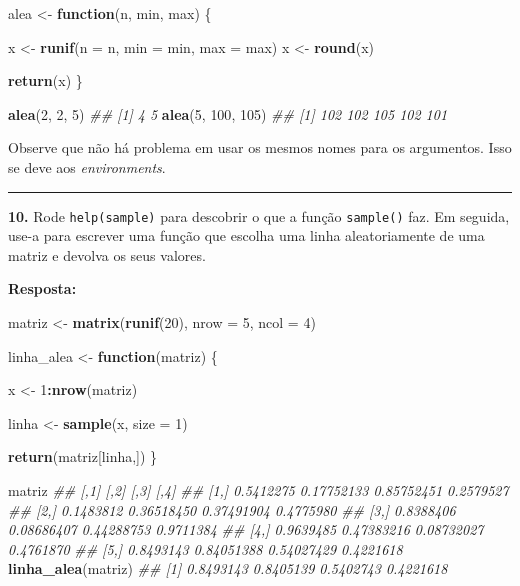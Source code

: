 \documentclass[]{book}
\newenvironment{Shaded}{\begin{snugshade}}{\end{snugshade}}
\newcommand{\CommentTok}[1]{\textcolor[rgb]{0.56,0.35,0.01}{\textit{#1}}}
\newcommand{\ControlFlowTok}[1]{\textcolor[rgb]{0.13,0.29,0.53}{\textbf{#1}}}
\newcommand{\DataTypeTok}[1]{\textcolor[rgb]{0.13,0.29,0.53}{#1}}
\newcommand{\DecValTok}[1]{\textcolor[rgb]{0.00,0.00,0.81}{#1}}
\newcommand{\KeywordTok}[1]{\textcolor[rgb]{0.13,0.29,0.53}{\textbf{#1}}}
\newcommand{\NormalTok}[1]{#1}
\newcommand{\OperatorTok}[1]{\textcolor[rgb]{0.81,0.36,0.00}{\textbf{#1}}}
\newcommand{\StringTok}[1]{\textcolor[rgb]{0.31,0.60,0.02}{#1}}
\begin{document}
\begin{Shaded}
\begin{Highlighting}[]
\NormalTok{alea <-}\StringTok{ }\ControlFlowTok{function}\NormalTok{(n, min, max) \{}
  
\NormalTok{  x <-}\StringTok{ }\KeywordTok{runif}\NormalTok{(}\DataTypeTok{n =}\NormalTok{ n, }\DataTypeTok{min =}\NormalTok{ min, }\DataTypeTok{max =}\NormalTok{ max)}
\NormalTok{  x <-}\StringTok{ }\KeywordTok{round}\NormalTok{(x)}
  
  \KeywordTok{return}\NormalTok{(x)}
\NormalTok{\}}

\KeywordTok{alea}\NormalTok{(}\DecValTok{2}\NormalTok{, }\DecValTok{2}\NormalTok{, }\DecValTok{5}\NormalTok{)}
\CommentTok{## [1] 4 5}
\KeywordTok{alea}\NormalTok{(}\DecValTok{5}\NormalTok{, }\DecValTok{100}\NormalTok{, }\DecValTok{105}\NormalTok{)}
\CommentTok{## [1] 102 102 105 102 101}
\end{Highlighting}
\end{Shaded}

Observe que não há problema em usar os mesmos nomes para os argumentos. Isso se deve aos \emph{environments}.

\begin{center}\rule{0.5\linewidth}{\linethickness}\end{center}

\textbf{10.} Rode \texttt{help(sample)} para descobrir o que a função \texttt{sample()} faz. Em seguida, use-a para escrever uma função que escolha uma linha aleatoriamente de uma matriz e devolva os seus valores.

\textbf{Resposta:}

\begin{Shaded}
\begin{Highlighting}[]
\NormalTok{matriz <-}\StringTok{ }\KeywordTok{matrix}\NormalTok{(}\KeywordTok{runif}\NormalTok{(}\DecValTok{20}\NormalTok{), }\DataTypeTok{nrow =} \DecValTok{5}\NormalTok{, }\DataTypeTok{ncol =} \DecValTok{4}\NormalTok{)}

\NormalTok{linha_alea <-}\StringTok{ }\ControlFlowTok{function}\NormalTok{(matriz) \{}
  
\NormalTok{  x <-}\StringTok{ }\DecValTok{1}\OperatorTok{:}\KeywordTok{nrow}\NormalTok{(matriz)}
  
\NormalTok{  linha <-}\StringTok{ }\KeywordTok{sample}\NormalTok{(x, }\DataTypeTok{size =} \DecValTok{1}\NormalTok{)}
  
  \KeywordTok{return}\NormalTok{(matriz[linha,])}
\NormalTok{\}}

\NormalTok{matriz}
\CommentTok{##           [,1]       [,2]       [,3]      [,4]}
\CommentTok{## [1,] 0.5412275 0.17752133 0.85752451 0.2579527}
\CommentTok{## [2,] 0.1483812 0.36518450 0.37491904 0.4775980}
\CommentTok{## [3,] 0.8388406 0.08686407 0.44288753 0.9711384}
\CommentTok{## [4,] 0.9639485 0.47383216 0.08732027 0.4761870}
\CommentTok{## [5,] 0.8493143 0.84051388 0.54027429 0.4221618}
\KeywordTok{linha_alea}\NormalTok{(matriz)}
\CommentTok{## [1] 0.8493143 0.8405139 0.5402743 0.4221618}
\end{Highlighting}
\end{Shaded}
\end{document}
